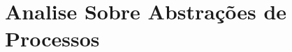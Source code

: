\chapter{Analise Sobre Abstrações de Processos}
\label{cap:analise-sobre-abstracoes-de-processos}


